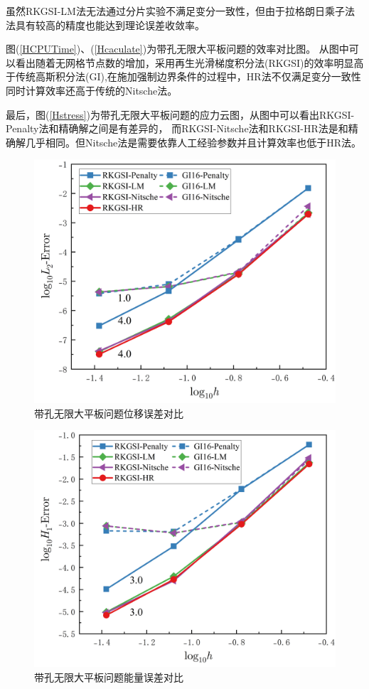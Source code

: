 虽然RKGSI-LM法无法通过分片实验不满足变分一致性，但由于拉格朗日乘子法法具有较高的精度也能达到理论误差收敛率。\par
图(\ref{HCPUTime})、(\ref{Hcaculate})为带孔无限大平板问题的效率对比图。
从图中可以看出随着无网格节点数的增加，采用再生光滑梯度积分法(RKGSI)的效率明显高于传统高斯积分法(GI),在施加强制边界条件的过程中，HR法不仅满足变分一致性同时计算效率还高于传统的Nitsche法。\par
最后，图(\ref{Hstress})为带孔无限大平板问题的应力云图，从图中可以看出RKGSI-Penalty法和精确解之间是有差异的，
而RKGSI-Nitsche法和RKGSI-HR法是和精确解几乎相同。但Nitsche法是需要依靠人工经验参数并且计算效率也低于HR法。
\begin{figure}[H]
    \centering
    \includegraphics[scale=0.5]{figure/E/hole/L2.png}
    \caption{带孔无限大平板问题位移误差对比}\label{HL2}
\end{figure}
\begin{figure}[H]
    \centering
    \includegraphics[scale=0.5]{figure/E/hole/H1.png}
    \caption{带孔无限大平板问题能量误差对比}\label{HH1}
\end{figure}
